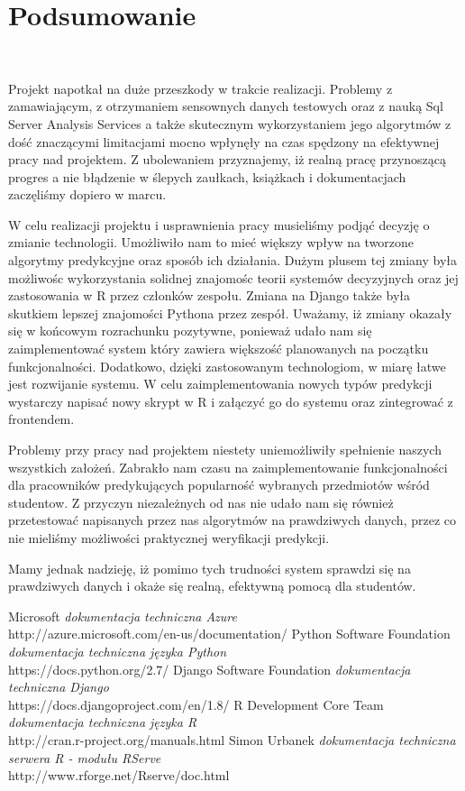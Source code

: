 \documentclass[licencjacka]{pracamgr}
\begin{document}
\chapter{Podsumowanie} ~\\ \indent


Projekt napotkał na duże przeszkody w trakcie realizacji. Problemy z zamawiającym, z otrzymaniem sensownych danych testowych oraz z nauką Sql Server Analysis Services a także skutecznym wykorzystaniem jego algorytmów z dość znaczącymi limitacjami mocno wpłynęły na czas spędzony na efektywnej pracy nad projektem. Z ubolewaniem przyznajemy, iż realną pracę przynoszącą progres a nie błądzenie w ślepych zaułkach, książkach i dokumentacjach zaczęliśmy dopiero w marcu.

W celu realizacji projektu i usprawnienia pracy musieliśmy podjąć decyzję o zmianie technologii. Umożliwiło nam to mieć większy wpływ na tworzone algorytmy predykcyjne oraz sposób ich działania. Dużym plusem tej zmiany była możliwośc wykorzystania solidnej znajomośc teorii systemów decyzyjnych oraz jej zastosowania w R przez członków zespołu. Zmiana na Django także była skutkiem lepszej znajomości Pythona przez zespół. Uważamy, iż zmiany okazały się w końcowym rozrachunku pozytywne, ponieważ udało nam się zaimplementować system który zawiera większość planowanych na początku funkcjonalności. Dodatkowo, dzięki zastosowanym technologiom, w miarę łatwe jest rozwijanie systemu. W celu zaimplementowania nowych typów predykcji wystarczy napisać nowy skrypt w R i załączyć go do systemu oraz zintegrować z frontendem.

Problemy przy pracy nad projektem niestety uniemożliwiły spełnienie naszych wszystkich założeń. Zabrakło nam czasu na zaimplementowanie funkcjonalności dla pracowników predykujących popularność wybranych przedmiotów wśród studentow. Z przyczyn niezależnych od nas nie udało nam się również przetestować napisanych przez nas algorytmów na prawdziwych danych, przez co nie mieliśmy możliwości praktycznej weryfikacji predykcji. 

Mamy jednak nadzieję, iż pomimo tych trudności system sprawdzi się na prawdziwych danych i okaże się realną, efektywną pomocą dla studentów.


\begin{thebibliography}{99}
 Microsoft
\textit{dokumentacja techniczna Azure} \\
http://azure.microsoft.com/en-us/documentation/
Python Software Foundation
\textit{dokumentacja techniczna języka Python} \\
https://docs.python.org/2.7/
 Django Software Foundation
\textit{dokumentacja techniczna Django} \\ 
https://docs.djangoproject.com/en/1.8/
 R Development Core Team
\textit{dokumentacja techniczna języka R} \\
http://cran.r-project.org/manuals.html
 Simon Urbanek
\textit{dokumentacja techniczna serwera R - modułu RServe} \\
http://www.rforge.net/Rserve/doc.html
\end{thebibliography}
\end{document}
